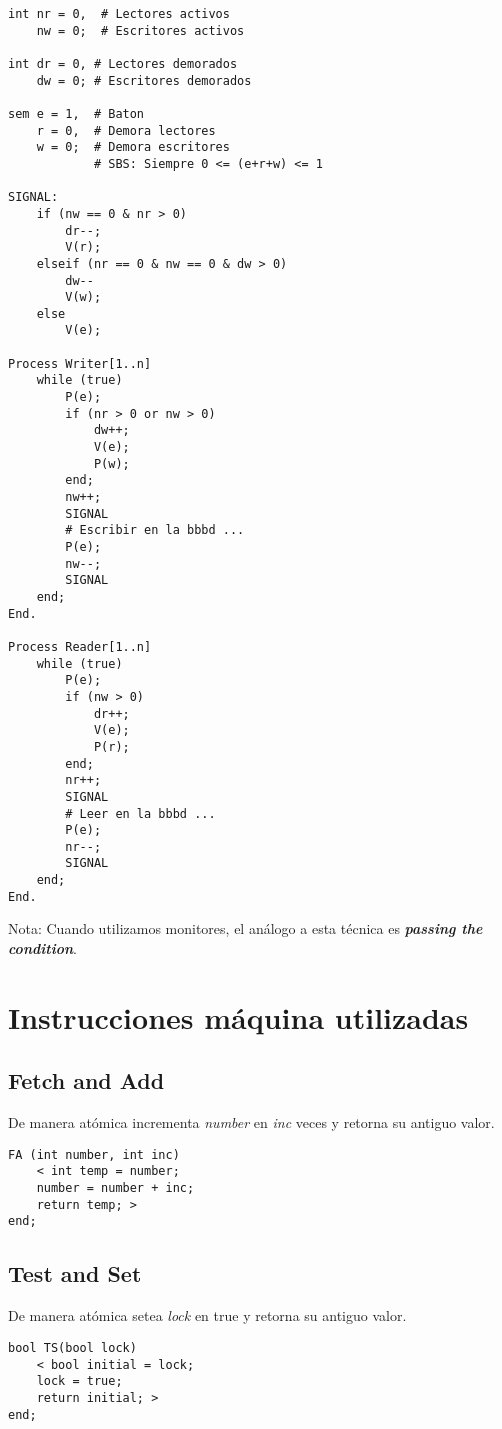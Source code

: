 \documentclass[a4paper, 11pt]{book}
\begin{document}
\begin{lstlisting}
int nr = 0,  # Lectores activos
    nw = 0;  # Escritores activos

int dr = 0, # Lectores demorados
    dw = 0; # Escritores demorados

sem e = 1,  # Baton
    r = 0,  # Demora lectores
    w = 0;  # Demora escritores
            # SBS: Siempre 0 <= (e+r+w) <= 1

SIGNAL:
    if (nw == 0 & nr > 0)
        dr--;
        V(r);
    elseif (nr == 0 & nw == 0 & dw > 0)
        dw--
        V(w);
    else
        V(e);

Process Writer[1..n]
    while (true)
        P(e);
        if (nr > 0 or nw > 0)
            dw++;
            V(e);
            P(w);
        end;
        nw++;
        SIGNAL
        # Escribir en la bbbd ...
        P(e);
        nw--;
        SIGNAL
    end;
End.

Process Reader[1..n]
    while (true)
        P(e);
        if (nw > 0)
            dr++;
            V(e);
            P(r);
        end;
        nr++;
        SIGNAL
        # Leer en la bbbd ...
        P(e);
        nr--;
        SIGNAL
    end;
End.
\end{lstlisting}

Nota: Cuando utilizamos monitores, el análogo a esta técnica es \textbf{\emph{passing the condition}}.

\section{Instrucciones máquina utilizadas}

\subsection{Fetch and Add}
De manera atómica incrementa \emph{number} en \emph{inc} veces y retorna su antiguo valor.

\begin{lstlisting}
FA (int number, int inc)
    < int temp = number;
    number = number + inc;
    return temp; >
end;
\end{lstlisting}

\subsection{Test and Set}

De manera atómica setea \emph{lock} en true y retorna su antiguo valor.

\begin{lstlisting}
bool TS(bool lock)
    < bool initial = lock; 
    lock = true; 
    return initial; >
end;
\end{lstlisting}
\end{document}
